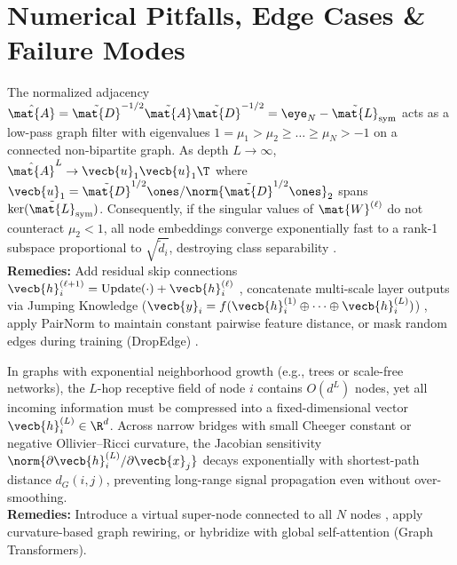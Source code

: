 \documentclass[../../../../master.tex]{subfiles}
\begin{document}
\section{Numerical Pitfalls, Edge Cases \& Failure Modes}
\label{sec:gnn:pitfalls}

\begin{pitfall}
\label{pit:gnn:oversmoothing}
The normalized adjacency $\hat{\mat{A}} = \tilde{\mat{D}}^{-1/2}\tilde{\mat{A}}\tilde{\mat{D}}^{-1/2} = \eye_N - \tilde{\mat{L}}_{\mathrm{sym}}$ acts as a low-pass graph filter with eigenvalues $1 = \mu_1 > \mu_2 \ge \dots \ge \mu_N > -1$ on a connected non-bipartite graph. As depth $L \to \infty$, $\hat{\mat{A}}^L \to \vecb{u}_1\vecb{u}_1\T$ where $\vecb{u}_1 = \tilde{\mat{D}}^{1/2}\ones / \norm{\tilde{\mat{D}}^{1/2}\ones}_2$ spans $\ker(\tilde{\mat{L}}_{\mathrm{sym}})$. Consequently, if the singular values of $\mat{W}^{(\ell)}$ do not counteract $\mu_2 < 1$, all node embeddings converge exponentially fast to a rank-1 subspace proportional to $\sqrt{\tilde{d}_i}$, destroying class separability .\\
\textbf{Remedies:} Add residual skip connections $\vecb{h}_i^{(\ell+1)} = \mathrm{Update}(\cdot) + \vecb{h}_i^{(\ell)}$ , concatenate multi-scale layer outputs via Jumping Knowledge ($\vecb{y}_i = f(\vecb{h}_i^{(1)} \oplus \dots \oplus \vecb{h}_i^{(L)})$) , apply PairNorm to maintain constant pairwise feature distance, or mask random edges during training (DropEdge) .
\end{pitfall}

\begin{pitfall}
\label{pit:gnn:oversquashing}
In graphs with exponential neighborhood growth (e.g., trees or scale-free networks), the $L$-hop receptive field of node $i$ contains $O(d^L)$ nodes, yet all incoming information must be compressed into a fixed-dimensional vector $\vecb{h}_i^{(L)} \in \R^d$. Across narrow bridges with small Cheeger constant or negative Ollivier--Ricci curvature, the Jacobian sensitivity $\norm{\partial \vecb{h}_i^{(L)} / \partial \vecb{x}_j}$ decays exponentially with shortest-path distance $d_G(i,j)$, preventing long-range signal propagation even without over-smoothing.\\
\textbf{Remedies:} Introduce a virtual super-node connected to all $N$ nodes , apply curvature-based graph rewiring, or hybridize with global self-attention (Graph Transformers).
\end{pitfall}
\end{document}
